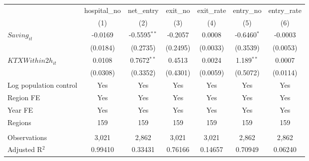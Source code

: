 \begingroup
\centering
\begin{tabular}{lcccccc}
   \toprule
                          & hospital\_no  & net\_entry     & exit\_no  & exit\_rate  & entry\_no     & entry\_rate \\    
                          & (1)           & (2)            & (3)       & (4)         & (5)           & (6)\\  
   \midrule 
   $Saving_{it}$          & -0.0169       & -0.5595$^{**}$ & -0.2057   & 0.0008      & -0.6460$^{*}$ & -0.0003\\   
                          & (0.0184)      & (0.2735)       & (0.2495)  & (0.0033)    & (0.3539)      & (0.0053)\\   
   $KTXWithin2h_{it}$     & 0.0108        & 0.7672$^{**}$  & 0.4513    & 0.0024      & 1.189$^{**}$  & 0.0007\\   
                          & (0.0308)      & (0.3352)       & (0.4301)  & (0.0059)    & (0.5072)      & (0.0114)\\   
   Log population control & Yes           & Yes            & Yes       & Yes         & Yes           & Yes\\  
   Region FE              & Yes           & Yes            & Yes       & Yes         & Yes           & Yes\\  
   Year FE                & Yes           & Yes            & Yes       & Yes         & Yes           & Yes\\  
   Regions                & 159           & 159            & 159       & 159         & 159           & 159\\  
    \\
   Observations           & 3,021         & 2,862          & 3,021     & 3,021       & 2,862         & 2,862\\  
   Adjusted R$^2$         & 0.99410       & 0.33431        & 0.76166   & 0.14657     & 0.70949       & 0.06240\\  
   \bottomrule
\end{tabular}
\par\endgroup
